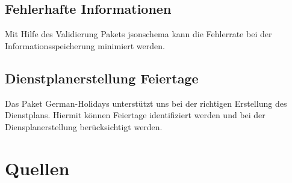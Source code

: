 \documentclass[11pt,
paper=a4,
bibtotocnumbered,	  %
liststotocnumbered,  %
DIV=calc,		  %
tablecaptionabove,	  %
headinclude,
]{article}
\begin{document}
\subsection{Fehlerhafte Informationen}
Mit Hilfe des Validierung Pakets jsonschema kann die Fehlerrate bei der Informationsspeicherung minimiert werden.
\subsection{Dienstplanerstellung Feiertage}
Das Paket German-Holidays unterstützt uns bei der richtigen Erstellung des Dienstplans. Hiermit können Feiertage identifiziert werden und bei der Diensplanerstellung berücksichtigt werden.
\section{Quellen}
\end{document}
